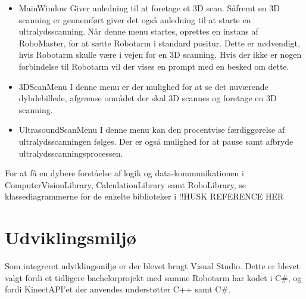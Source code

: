 \let\labelitemi\labelitemii
\begin{itemize}
\item{MainWindow}\newline
Giver anledning til at foretage et 3D scan. Såfremt en 3D scanning er gennemført giver det også anledning til at starte en ultralydsscanning.
Når denne menu startes, oprettes en instans af RoboMaster, for at sætte Robotarm i standard positur. Dette er nødvendigt, hvis Robotarm skulle være i vejen for en 3D scanning.
Hvis der ikke er nogen forbindelse til Robotarm vil der vises en prompt med en besked om dette.

\item{3DScanMenu}\newline
I denne menu er der mulighed for at se det nuværende dybdebillede, afgrænse området der skal 3D scannes og foretage en 3D scanning.

\item{UltrasoundScanMenu}\newline
I denne menu kan den procentvise færdiggørelse af ultralydsscanningen følges. Der er også mulighed for at pause samt afbryde ultralydsscanningsprocessen.
\end{itemize}

For at få en dybere forståelse af logik og data-kommunikationen i ComputerVisionLibrary, CalculationLibrary samt RoboLibrary, se klassediagrammerne for de enkelte biblioteker i !!HUSK REFERENCE HER

\section{Udviklingsmiljø} 
Som integreret udviklingsmiljø er der blevet brugt Visual Studio. Dette er blevet valgt fordi  et tidligere bachelorprojekt med samme Robotarm har kodet i C\#, og fordi KinectAPI'et der anvendes understøtter C++ samt C\#.


